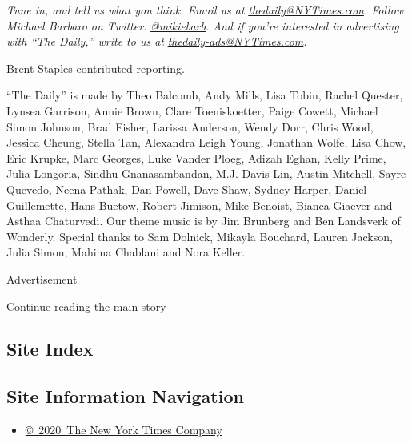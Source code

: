 \emph{Tune in, and tell us what you think. Email us at}
\href{mailto:thedaily@NYTimes.com}{\emph{thedaily@NYTimes.com}}\emph{.
Follow Michael Barbaro on Twitter:}
\href{https://twitter.com/mikiebarb}{\emph{@mikiebarb}}\emph{. And if
you're interested in advertising with ``The Daily,'' write to us at}
\href{mailto:thedaily-ads@NYTimes.com}{\emph{thedaily-ads@NYTimes.com}}\emph{.}

Brent Staples contributed reporting.

``The Daily'' is made by Theo Balcomb, Andy Mills, Lisa Tobin, Rachel
Quester, Lynsea Garrison, Annie Brown, Clare Toeniskoetter, Paige
Cowett, Michael Simon Johnson, Brad Fisher, Larissa Anderson, Wendy
Dorr, Chris Wood, Jessica Cheung, Stella Tan, Alexandra Leigh Young,
Jonathan Wolfe, Lisa Chow, Eric Krupke, Marc Georges, Luke Vander Ploeg,
Adizah Eghan, Kelly Prime, Julia Longoria, Sindhu Gnanasambandan, M.J.
Davis Lin, Austin Mitchell, Sayre Quevedo, Neena Pathak, Dan Powell,
Dave Shaw, Sydney Harper, Daniel Guillemette, Hans Buetow, Robert
Jimison, Mike Benoist, Bianca Giaever and Asthaa Chaturvedi. Our theme
music is by Jim Brunberg and Ben Landsverk of Wonderly. Special thanks
to Sam Dolnick, Mikayla Bouchard, Lauren Jackson, Julia Simon, Mahima
Chablani and Nora Keller.

Advertisement

\protect\hyperlink{after-bottom}{Continue reading the main story}

\hypertarget{site-index}{%
\subsection{Site Index}\label{site-index}}

\hypertarget{site-information-navigation}{%
\subsection{Site Information
Navigation}\label{site-information-navigation}}

\begin{itemize}
\tightlist
\item
  \href{https://help.nytimes3xbfgragh.onion/hc/en-us/articles/115014792127-Copyright-notice}{©~2020~The
  New York Times Company}
\end{itemize}

